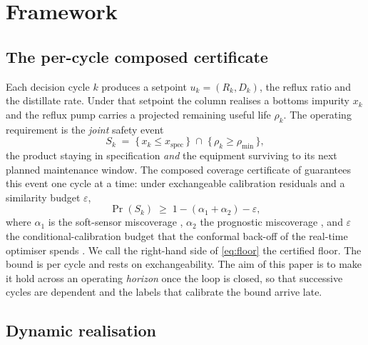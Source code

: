 \section{Framework}
\label{sec:framework}

\subsection{The per-cycle composed certificate}
\label{sec:percycle}

Each decision cycle $k$ produces a setpoint $u_k=(R_k,D_k)$, the reflux ratio and the
distillate rate. Under that setpoint the column realises a bottoms impurity $x_k$ and the
reflux pump carries a projected remaining useful life $\rho_k$. The operating requirement is
the \emph{joint} safety event
\begin{equation}
  S_k \;=\; \{\, x_k \le x_{\mathrm{spec}} \,\}\;\cap\;\{\, \rho_k \ge \rho_{\min} \,\},
  \label{eq:Sk}
\end{equation}
the product staying in specification \emph{and} the equipment surviving to its next planned
maintenance window. The composed coverage certificate of \citet{busico_m4} guarantees this
event one cycle at a time: under exchangeable calibration residuals and a similarity budget
$\varepsilon$,
\begin{equation}
  \Pr(S_k) \;\ge\; 1-(\alpha_1+\alpha_2)-\varepsilon,
  \label{eq:floor}
\end{equation}
where $\alpha_1$ is the soft-sensor miscoverage \citep{busico_m1}, $\alpha_2$ the prognostic
miscoverage \citep{busico_m2}, and $\varepsilon$ the conditional-calibration budget that the
conformal back-off of the real-time optimiser spends \citep{busico_m3}. We call the
right-hand side of \eqref{eq:floor} the certified floor. The bound is per cycle and rests on
exchangeability. The aim of this paper is to make it hold across an operating \emph{horizon}
once the loop is closed, so that successive cycles are dependent and the labels that calibrate
the bound arrive late.

\subsection{Dynamic realisation}
\label{sec:dynamic}

